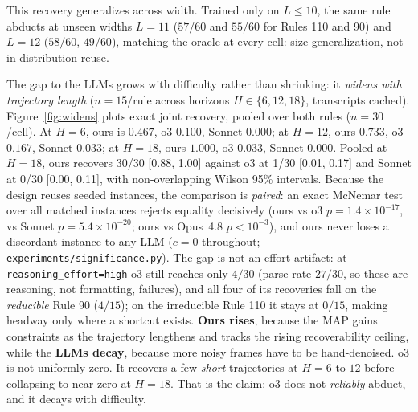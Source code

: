 \documentclass{article}
\begin{document}
This recovery generalizes across width. Trained only on $L \le 10$, the same rule abducts at unseen
widths $L=11$ ($57/60$ and $55/60$ for Rules 110 and 90) and $L=12$ ($58/60$, $49/60$), matching the
oracle at every cell: size generalization, not in-distribution reuse.

The gap to the LLMs grows with difficulty rather than shrinking: it
\emph{widens with trajectory length} ($n=15$/rule across horizons $H \in \{6,12,18\}$, transcripts
cached). Figure~\ref{fig:widens} plots exact joint recovery, pooled over both rules ($n=30$/cell). At
$H=6$, ours is $0.467$, o3 $0.100$, Sonnet $0.000$; at $H=12$, ours $0.733$, o3 $0.167$, Sonnet
$0.033$; at $H=18$, ours $1.000$, o3 $0.033$, Sonnet $0.000$. Pooled at $H=18$, ours recovers 30/30
[0.88, 1.00] against o3 at 1/30 [0.01, 0.17] and Sonnet at 0/30 [0.00, 0.11], with non-overlapping
Wilson 95\% intervals. Because the design reuses seeded instances, the comparison is \emph{paired}: an
exact McNemar test over all matched instances rejects equality decisively (ours vs o3
$p=1.4\times10^{-17}$, vs Sonnet $p=5.4\times10^{-20}$; ours vs Opus~4.8 $p<10^{-3}$), and ours never
loses a discordant instance to any LLM ($c=0$ throughout; \texttt{experiments/significance.py}). The gap is not an effort artifact: at \texttt{reasoning\_effort=high} o3 still
reaches only $4/30$ (parse rate $27/30$, so these are reasoning, not formatting, failures), and all
four of its recoveries fall on the \emph{reducible} Rule 90 ($4/15$); on the irreducible Rule 110 it
stays at $0/15$, making headway only where a shortcut exists. \textbf{Ours rises}, because the MAP gains
constraints as the trajectory lengthens and tracks the rising recoverability ceiling, while the
\textbf{LLMs decay}, because more noisy frames have to be hand-denoised. o3 is not uniformly zero. It
recovers a few \emph{short} trajectories at $H=6$ to $12$ before collapsing to near zero at $H=18$.
That is the claim: o3 does not \emph{reliably} abduct, and it decays with difficulty.
\end{document}
